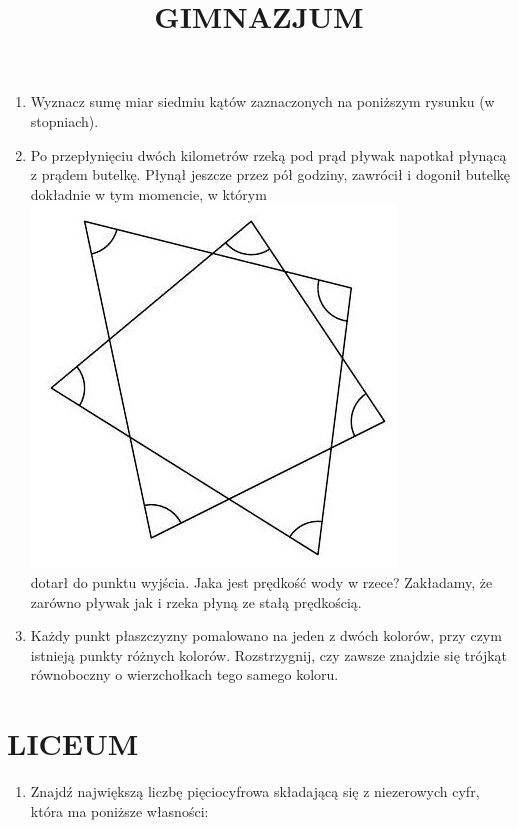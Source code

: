 \documentclass[10pt]{article}
\title{GIMNAZJUM }
\author{}
\date{}
\begin{document}
\maketitle
\begin{enumerate}
  \item Wyznacz sumę miar siedmiu kątów zaznaczonych na poniższym rysunku (w stopniach).
  \item Po przepłynięciu dwóch kilometrów rzeką pod prąd pływak napotkał płynącą z prądem butelkę. Płynął jeszcze przez pół godziny, zawrócił i dogonił butelkę dokładnie w tym momencie, w którym\\
\includegraphics[max width=\textwidth, center]{2024_11_21_7354292898531eb5c521g-1}\\
dotarł do punktu wyjścia. Jaka jest prędkość wody w rzece? Zakładamy, że zarówno pływak jak i rzeka płyną ze stałą prędkością.
  \item Każdy punkt płaszczyzny pomalowano na jeden z dwóch kolorów, przy czym istnieją punkty różnych kolorów. Rozstrzygnij, czy zawsze znajdzie się trójkąt równoboczny o wierzchołkach tego samego koloru.
\end{enumerate}

\section*{LICEUM}
\begin{enumerate}
  \item Znajdź największą liczbę pięciocyfrowa składającą się z niezerowych cyfr, która ma poniższe własności:
\end{enumerate}
\end{document}
